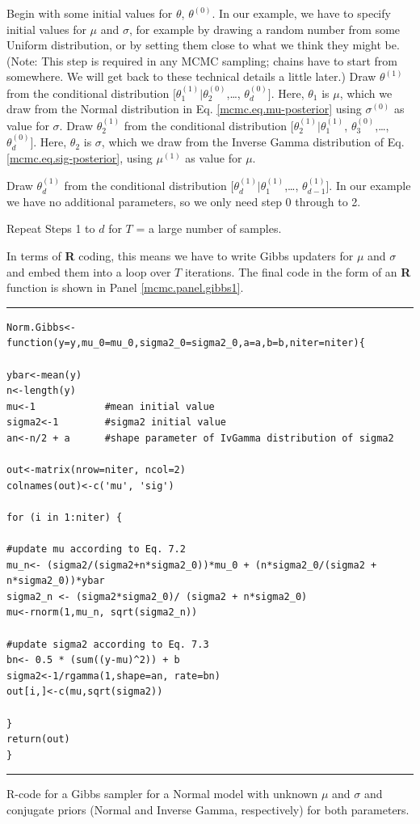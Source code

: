 { Begin with some initial values for $\theta$, $\theta^{(0)}$.}
In our example, we have to specify initial values for $\mu$ and $\sigma$, for
example by drawing a random number from some Uniform distribution, or
by setting them close to what we think they might be. (Note: This step
is required in any MCMC sampling; chains have to start from
somewhere. We will get back to these technical details a little
later.)
{ Draw $\theta^{(1)}$ from the conditional distribution $[\theta_{1}^{(1)}|\theta_{2}^{(0)}$,\ldots, $\theta_{d}^{(0)}]$. }
Here, $\theta_1$ is $\mu$, which we draw from the Normal distribution in Eq. \ref{mcmc.eq.mu-posterior}  using $\sigma^{(0)}$ as value for $\sigma$.
{ Draw $\theta_{2}^{(1)}$ from the conditional distribution $[\theta_{2}^{(1)}|\theta_{1}^{(1)}$, $\theta_{3}^{(0)}$,\ldots, $\theta_{d}^{(0)}]$. }
Here, $\theta_2$ is $\sigma$, which we draw from the Inverse Gamma
distribution of Eq. \ref{mcmc.eq.sig-posterior}, using $\mu^{(1)}$ as value for $\mu$.

{ Draw $\theta_{d}^{(1)}$ from the conditional distribution $[\theta_{d}^{(1)}|\theta_{1}^{(1)}$,\ldots, $\theta_{d-1}^{(1)}]$. }
In our example we have no additional parameters, so we only need step 0 through to 2.

{\flushleft Repeat Steps 1 to $d$ for $T$ = a large number of samples.}

In terms of {\bf R} coding, this means we have to write Gibbs updaters for
$\mu$ and $\sigma$ and embed them into a loop over $T$ iterations. The final
code in the form of an {\bf R} function is shown 
in Panel \ref{mcmc.panel.gibbs1}.


\begin{panel}[htp]
\centering
\rule[0.15in]{\textwidth}{.03in}
\begin{verbatim}
Norm.Gibbs<-function(y=y,mu_0=mu_0,sigma2_0=sigma2_0,a=a,b=b,niter=niter){

ybar<-mean(y)
n<-length(y)
mu<-1            #mean initial value
sigma2<-1        #sigma2 initial value
an<-n/2 + a      #shape parameter of IvGamma distribution of sigma2

out<-matrix(nrow=niter, ncol=2)
colnames(out)<-c('mu', 'sig')

for (i in 1:niter) {

#update mu according to Eq. 7.2
mu_n<- (sigma2/(sigma2+n*sigma2_0))*mu_0 + (n*sigma2_0/(sigma2 + n*sigma2_0))*ybar 
sigma2_n <- (sigma2*sigma2_0)/ (sigma2 + n*sigma2_0)
mu<-rnorm(1,mu_n, sqrt(sigma2_n))

#update sigma2 according to Eq. 7.3
bn<- 0.5 * (sum((y-mu)^2)) + b
sigma2<-1/rgamma(1,shape=an, rate=bn)
out[i,]<-c(mu,sqrt(sigma2))

}
return(out)
}
\end{verbatim}
\rule[-0.15in]{\textwidth}{.03in}
\caption{
R-code for a Gibbs sampler for a Normal model with unknown $\mu$
and $\sigma$ and conjugate priors (Normal and Inverse Gamma, respectively) 
for both parameters.
}
\label{mcmc.panel.gibbs1}
\end{panel}

